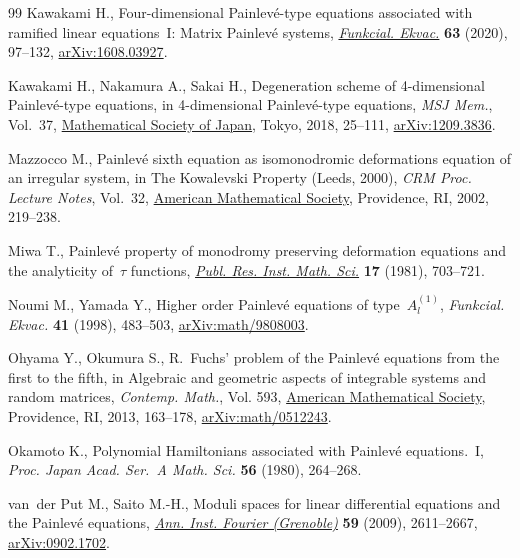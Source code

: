 \documentclass[10pt,a4paper]{amsart}
\numberwithin{equation}{section}
\begin{document}
\begin{thebibliography}{99}
Kawakami H., Four-dimensional {P}ainlev\'e-type equations associated with
 ramified linear equations~{I}: {M}atrix {P}ainlev\'e systems,
 \href{https://doi.org/10.1619/fesi.63.97}{\textit{Funkcial. Ekvac.}}
 \textbf{63} (2020), 97--132,
 \href{http://arxiv.org/abs/1608.03927}{arXiv:1608.03927}.

Kawakami H., Nakamura A., Sakai H., Degeneration scheme of 4-dimensional
 {P}ainlev\'e-type equations, in 4-dimensional {P}ainlev\'e-type equations,
 \textit{MSJ Mem.}, Vol.~37,
 \href{https://doi.org/10.2969/msjmemoirs/03701C020}{Mathematical Society of
 Japan}, Tokyo, 2018, 25--111,
 \href{http://arxiv.org/abs/1209.3836}{arXiv:1209.3836}.

Mazzocco M., Painlev\'e sixth equation as isomonodromic deformations equation
 of an irregular system, in The {K}owalevski {P}roperty ({L}eeds, 2000),
 \textit{CRM Proc. Lecture Notes}, Vol.~32,
 \href{https://doi.org/10.1090/crmp/032/12}{American Mathematical Society},
 Providence, RI, 2002, 219--238.

Miwa T., Painlev\'e property of monodromy preserving deformation equations and
 the analyticity of~{$\tau $} functions,
 \href{https://doi.org/10.2977/prims/1195185270}{\textit{Publ. Res. Inst.
 Math. Sci.}} \textbf{17} (1981), 703--721.

Noumi M., Yamada Y., Higher order {P}ainlev\'e equations of type~{$A^{(1)}_l$},
 \textit{Funkcial. Ekvac.} \textbf{41} (1998), 483--503,
 \href{http://arxiv.org/abs/math/9808003}{arXiv:math/9808003}.

Ohyama Y., Okumura S., R.~{F}uchs' problem of the {P}ainlev\'e equations from
 the first to the fifth, in Algebraic and geometric aspects of integrable
 systems and random matrices, \textit{Contemp. Math.}, Vol. 593,
 \href{https://doi.org/10.1090/conm/593/11876}{American Mathematical Society}, Providence, RI, 2013, 163--178,
 \href{http://arxiv.org/abs/math/0512243}{arXiv:math/0512243}.

Okamoto K., Polynomial {H}amiltonians associated with {P}ainlev\'e
 equations.~{I}, \textit{Proc. Japan Acad. Ser.~A Math. Sci.} \textbf{56}
 (1980), 264--268.

van~der Put M., Saito M.-H., Moduli spaces for linear differential equations and
 the {P}ainlev\'e equations,
 \href{https://doi.org/10.5802/aif.2502}{\textit{Ann. Inst. Fourier
 (Grenoble)}} \textbf{59} (2009), 2611--2667,
 \href{http://arxiv.org/abs/0902.1702}{arXiv:0902.1702}.


\end{thebibliography}
\end{document}
